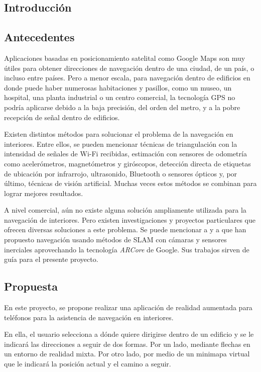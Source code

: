\documentclass{article}
\newenvironment{standalone}{\begin{preview}}{\end{preview}}
\begin{document}
\begin{standalone}

  \section{Introducción}

  \subsection{Antecedentes}

  Aplicaciones basadas en posicionamiento satelital como Google Maps son muy útiles para obtener direcciones de navegación dentro de una ciudad, de un país, o incluso entre países.
  Pero a menor escala, para navegación dentro de edificios en donde puede haber numerosas habitaciones y pasillos, como un museo, un hospital, una planta industrial o un centro comercial, la tecnología GPS no podría aplicarse debido a la baja precisión, del orden del metro, y a la pobre recepción de señal dentro de edificios.

  Existen distintos métodos para solucionar el problema de la navegación en interiores.
  Entre ellos, se pueden mencionar técnicas de triangulación con la intensidad de señales de Wi-Fi recibidas, estimación con sensores de odometría como acelerómetros, magnetómetros y giróscopos, detección directa de etiquetas de ubicación por infrarrojo, ultrasonido, Bluetooth o sensores ópticos y, por último, técnicas de visión artificial.
  Muchas veces estos métodos se combinan para lograr mejores resultados.

  A nivel comercial, aún no existe alguna solución ampliamente utilizada para la navegación de interiores.
  Pero existen investigaciones y proyectos particulares que ofrecen diversas soluciones a este problema.
  Se puede mencionar a \citeauthor{slamNavARM} \cite{slamNavARM} y a \citeauthor{indoorNavRacoons} \cite{indoorNavRacoons} que han propuesto navegación usando métodos de SLAM con cámaras y sensores inerciales aprovechando la tecnología \textit{ARCore} de Google.
  Sus trabajos sirven de guía para el presente proyecto.

  \subsection{Propuesta}

  En este proyecto, se propone realizar una aplicación de realidad aumentada para teléfonos para la asistencia de navegación en interiores.

  En ella, el usuario selecciona a dónde quiere dirigirse dentro de un edificio y se le indicará las direcciones a seguir de dos formas.
  Por un lado, mediante flechas en un entorno de realidad mixta. Por otro lado, por medio de un minimapa virtual que le indicará la posición actual y el camino a seguir.

\end{standalone}
\end{document}

